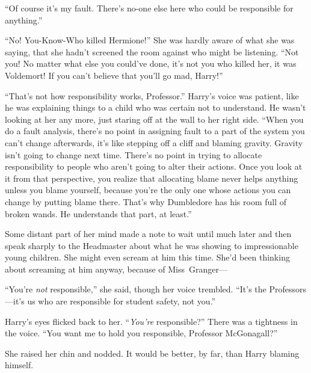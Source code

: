“Of course it’s my fault. There’s no-one else here who could be responsible for anything.”

“No! You-Know-Who killed Hermione!” She was hardly aware of what she was saying, that she hadn’t screened the room against who might be listening.
“Not you! No matter what else you could’ve done, it’s not you who killed her, it was Voldemort! If you can’t believe that you’ll go mad, Harry!”

“That’s not how responsibility works, Professor.” Harry’s voice was patient, like he was explaining things to a child who was certain not to understand. He wasn’t looking at her any more, just staring off at the wall to her right side.
“When you do a fault analysis, there’s no point in assigning fault to a part of the system you can’t change afterwards, it’s like stepping off a cliff and blaming gravity. Gravity isn’t going to change next time. There’s no point in trying to allocate responsibility to people who aren’t going to alter their actions. Once you look at it from that perspective, you realize that allocating blame never helps anything unless you blame yourself, because you’re the only one whose actions you can change by putting blame there. That’s why Dumbledore has his room full of broken wands. He understands that part, at least.”

Some distant part of her mind made a note to wait until much later and then speak sharply to the Headmaster about what he was showing to impressionable young children. She might even scream at him this time. She’d been thinking about screaming at him anyway, because of Miss~Granger—

“You’re \emph{not} responsible,” she said, though her voice trembled.
“It’s the Professors—it’s us who are responsible for student safety, not you.”

Harry’s eyes flicked back to her. “\emph{You’re} responsible?” There was a tightness in the voice.
“You want me to hold you responsible, Professor McGonagall?”

She raised her chin and nodded. It would be better, by far, than Harry blaming himself.

